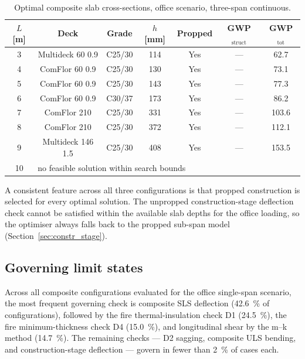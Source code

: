 \begin{table}[h!]
\small\centering
\caption{Optimal composite slab cross-sections, office scenario, three-span continuous.}
\label{tab:office_3span}
\begin{tabular}{ccccccc}
\toprule
$L$ [m] & Deck & Grade & $h$ [mm] & Propped & GWP$_\mathrm{struct}$ & GWP$_\mathrm{tot}$ \\
\midrule
3 & Multideck 60 0.9 & C25/30 & 114 & Yes & --- & 62.7 \\
4 & ComFlor 60 0.9   & C25/30 & 130 & Yes & --- & 73.1 \\
5 & ComFlor 60 0.9   & C25/30 & 143 & Yes & --- & 77.3 \\
6 & ComFlor 60 0.9   & C30/37 & 173 & Yes & --- & 86.2 \\
7 & ComFlor 210      & C25/30 & 331 & Yes & --- & 103.6 \\
8 & ComFlor 210      & C25/30 & 372 & Yes & --- & 112.1 \\
9 & Multideck 146 1.5 & C25/30 & 408 & Yes & --- & 153.5 \\
10 & \multicolumn{6}{l}{no feasible solution within search bounds} \\
\bottomrule
\end{tabular}
\end{table}

A consistent feature across all three configurations is that propped construction is selected for every optimal solution. The unpropped construction-stage deflection check cannot be satisfied within the available slab depths for the office loading, so the optimiser always falls back to the propped sub-span model (Section~\ref{sec:constr_stage}).

\subsection{Governing limit states}
\label{sec:res_gov_office}
Across all composite configurations evaluated for the office single-span scenario, the most frequent governing check is composite SLS deflection (\SI{42.6}{\percent} of configurations), followed by the fire thermal-insulation check D1 (\SI{24.5}{\percent}), the fire minimum-thickness check D4 (\SI{15.0}{\percent}), and longitudinal shear by the m--k method (\SI{14.7}{\percent}). The remaining checks --- D2 sagging, composite ULS bending, and construction-stage deflection --- govern in fewer than \SI{2}{\percent} of cases each.

